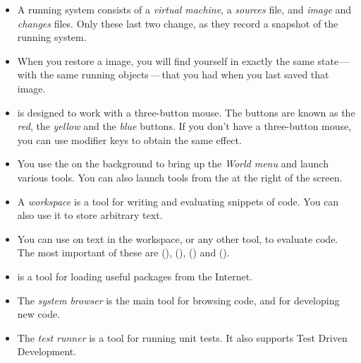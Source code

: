 \documentclass[a4paper,10pt,twoside]{book}
\begin{document}
\begin{itemize}
  \item A running \sq system consists of a \emph{virtual machine}, a \emph{sources} file, and \emph{image} and \emph{changes} files. Only these last two change, as they record a snapshot of the running system.
  \item When you restore a \sq image, you will find yourself in exactly the same state\,---\,with the same running objects\,---\,that you had when you last saved that image.
  \item \sq is designed to work with a three-button mouse. The buttons are known as the \emph{red}, the \emph{yellow} and the \emph{blue} buttons. If you don't have a three-button mouse, you can use modifier keys to obtain the same effect.
  \item You use the  on the \sq background to bring up the \emph{World menu} and launch various tools. You can also launch tools from the \toolsflapind at the right of the \sq screen.
  \item A \emph{workspace} is a tool for writing and evaluating snippets of code. You can also use it to store arbitrary text.
  \item You can use  on text in the workspace, or any other tool, to evaluate code. The most important of these are  (),  (),  () and  ().
  \item \sqmap is a tool for loading useful packages from the Internet.
  \item The \emph{system browser} is the main tool for browsing \sq code, and for developing new code.
  \item The \emph{test runner} is a tool for running unit tests. It also supports Test Driven Development.
\end{itemize}

\ifx\wholebook\relax\else 
   
   
\end{document}

